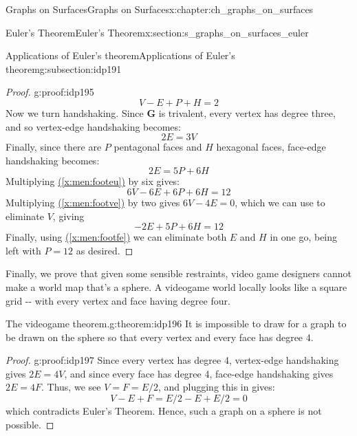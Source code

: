 \documentclass[oneside,10pt,]{book}
\newcommand{\xreffont}{\relax}
\numberwithin{equation}{section}
\newcommand{\bfG}{\mathbf{G}}
\begin{document}
\begin{chapterptx}{Graphs on Surfaces}{}{Graphs on Surfaces}{}{}{x:chapter:ch_graphs_on_surfaces}
\begin{sectionptx}{Euler's Theorem}{}{Euler's Theorem}{}{}{x:section:s_graphs_on_surfaces_euler}
\begin{subsectionptx}{Applications of Euler's theorem}{}{Applications of Euler's theorem}{}{}{g:subsection:idp191}
\begin{proof}{}{g:proof:idp195}
%
\begin{equation}
V-E+P+H=2\label{x:men:footeu}
\end{equation}
Now we turn handshaking.  Since \(\bfG\) is trivalent, every vertex has degree three, and so vertex-edge handshaking becomes:%
%
\begin{equation}
2E=3V\label{x:men:footve}
\end{equation}
Finally, since there are \(P\) pentagonal faces and \(H\) hexagonal faces, face-edge handshaking becomes:%
%
\begin{equation}
2E=5P+6H\label{x:men:footfe}
\end{equation}
Multiplying \hyperref[x:men:footeu]{({\xreffont\ref{x:men:footeu}})} by six gives:%
%
\begin{equation*}
6V-6E+6P+6H=12
\end{equation*}
Multiplying \hyperref[x:men:footve]{({\xreffont\ref{x:men:footve}})} by two gives \(6V-4E=0\), which we can use to eliminate \(V\), giving%
%
\begin{equation*}
-2E+5P+6H=12
\end{equation*}
Finally, using \hyperref[x:men:footfe]{({\xreffont\ref{x:men:footfe}})} we can eliminate both \(E\) and \(H\) in one go, being left with \(P=12\) as desired.%
\end{proof}
Finally, we prove that given some sensible restraints, video game designers cannot make a world map that's a sphere.  A videogame world locally looks like a square grid -{}-{} with every vertex and face having degree four.%
\begin{theorem}{The videogame theorem.}{}{g:theorem:idp196}%
It is impossible to draw for a graph to be drawn on the sphere so that every vertex and every face has degree 4.%
\end{theorem}
\begin{proof}{}{g:proof:idp197}
Since every vertex has degree 4, vertex-edge handshaking gives \(2E=4V\), and since every face has degree 4, face-edge handshaking gives \(2E=4F\).  Thus, we see \(V=F=E/2\), and plugging this in gives:%
%
\begin{equation*}
V-E+F=E/2-E+E/2=0
\end{equation*}
which contradicts Euler's Theorem.  Hence, such a graph on a sphere is not possible.%
\end{proof}
\end{subsectionptx}
\end{sectionptx}
%
%
\typeout{************************************************}

\end{chapterptx}
\end{document}
